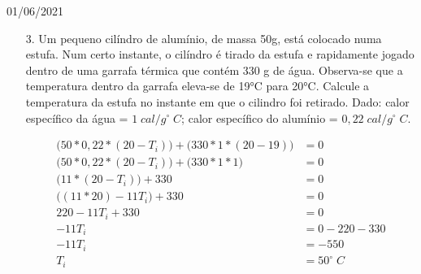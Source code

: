 \documentclass{SchoolBook}
\begin{document}
\begin{day}{01/06/2021}
\begin{enumerate}
            \item[3.] Um pequeno cilíndro de alumínio, de massa 50g, está colocado numa estufa. Num certo instante, o cilíndro é tirado da estufa e rapidamente jogado dentro de uma garrafa térmica que contém 330 g de água. Observa-se que a temperatura dentro da garrafa eleva-se de 19°C para 20°C. Calcule a temperatura da estufa no instante em que o cilindro foi retirado. Dado: calor específico da água = $1\;cal/g^\circ\;C$; calor específico do alumínio = $0,22\;cal/g^\circ\;C$.
            
            \begin{align*}
                \Big(50 * 0,22 * (20 - T_i)\Big) + \Big(330 * 1 * (20 - 19)\Big) &= 0 \\
                \Big(50 * 0,22 * (20 - T_i)\Big) + \Big(330 * 1 * 1\Big) &= 0 \\
                \Big(11 * (20 - T_i)\Big) + 330 &= 0 \\
                \Big((11 * 20) - 11 T_i\Big) + 330 &= 0 \\
                220 - 11 T_i + 330 &= 0 \\
                -11 T_i &= 0 - 220 - 330 \\
                -11 T_i &= -550 \\
                T_i &= 50^\circ\;C
            \end{align*}
            

\end{enumerate}
\end{day}
\end{document}
